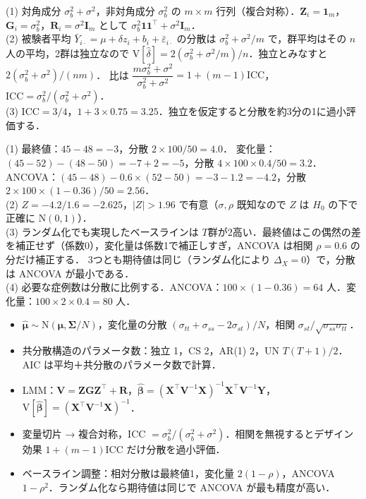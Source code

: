 \documentclass[a4paper,11pt,openany]{ltjsbook}
\newenvironment{kaitou}[1]{%
  \par\medskip\noindent
  \begin{tcolorbox}[enhanced,breakable,colback=bkgray!3,colframe=bkgray!60,boxrule=0.4pt,
    left=4pt,right=4pt,top=2pt,bottom=2pt,arc=1pt,
    title={\cref{#1}の解答},fonttitle=\bfseries\small,coltitle=white,colbacktitle=bkgray!80]}%
  {\end{tcolorbox}\par}
\newcommand{\V}{\mathrm{V}}
\newcommand{\Normal}{\mathrm{N}}
\newcommand{\transp}{^{\top}}
\begin{document}
\begin{kaitou}{reidai:08-2}
(1) 対角成分 $\sigma_b^2+\sigma^2$，非対角成分 $\sigma_b^2$ の $m\times m$ 行列（複合対称）．$\bm Z_i=\bm1_m$，$\bm G_i=\sigma_b^2$，$\bm R_i=\sigma^2\bm I_m$ として $\sigma_b^2\bm1\bm1\transp+\sigma^2\bm I_m$．\\
(2) 被験者平均 $\bar Y_{i\cdot}=\mu+\delta z_i+b_i+\bar\varepsilon_{i\cdot}$ の分散は $\sigma_b^2+\sigma^2/m$ で，群平均はその $n$ 人の平均，2群は独立なので
$\V[\hat\delta]=2(\sigma_b^2+\sigma^2/m)/n$．独立とみなすと $2(\sigma_b^2+\sigma^2)/(nm)$．
比は $\dfrac{m\sigma_b^2+\sigma^2}{\sigma_b^2+\sigma^2}=1+(m-1)\mathrm{ICC}$，$\mathrm{ICC}=\sigma_b^2/(\sigma_b^2+\sigma^2)$．\\
(3) $\mathrm{ICC}=3/4$，$1+3\times0.75=3.25$．独立を仮定すると分散を約3分の1に過小評価する．
\end{kaitou}

\begin{kaitou}{reidai:08-3}
(1) 最終値：$45-48=-3$，分散 $2\times100/50=4.0$．
変化量：$(45-52)-(48-50)=-7+2=-5$，分散 $4\times100\times0.4/50=3.2$．
ANCOVA：$(45-48)-0.6\times(52-50)=-3-1.2=-4.2$，分散 $2\times100\times(1-0.36)/50=2.56$．\\
(2) $Z=-4.2/1.6=-2.625$，$|Z|>1.96$ で有意（$\sigma,\rho$ 既知なので $Z$ は $H_0$ の下で正確に $\Normal(0,1)$）．\\
(3) ランダム化でも実現したベースラインは $T$群が2高い．最終値はこの偶然の差を補正せず（係数0），変化量は係数1で補正しすぎ，ANCOVA は相関 $\rho=0.6$ の分だけ補正する．
3つとも期待値は同じ（ランダム化により $\Delta_X=0$）で，分散は ANCOVA が最小である．\\
(4) 必要な症例数は分散に比例する．ANCOVA：$100\times(1-0.36)=64$ 人．変化量：$100\times2\times0.4=80$ 人．
\end{kaitou}

\begin{summarybox}
\begin{itemize}
\item $\hat{\bm\mu}\sim\Normal(\bm\mu,\bm\Sigma/N)$，変化量の分散 $(\sigma_{tt}+\sigma_{ss}-2\sigma_{st})/N$，相関 $\sigma_{st}/\sqrt{\sigma_{ss}\sigma_{tt}}$．
\item 共分散構造のパラメータ数：独立 1，CS 2，AR(1) 2，UN $T(T+1)/2$．AIC は平均＋共分散のパラメータ数で計算．
\item LMM：$\bm V=\bm Z\bm G\bm Z\transp+\bm R$，$\hat{\bm\beta}=(\bm X\transp\bm V^{-1}\bm X)^{-1}\bm X\transp\bm V^{-1}\bm Y$，$\V[\hat{\bm\beta}]=(\bm X\transp\bm V^{-1}\bm X)^{-1}$．
\item 変量切片 → 複合対称，ICC $=\sigma_b^2/(\sigma_b^2+\sigma^2)$．相関を無視するとデザイン効果 $1+(m-1)\mathrm{ICC}$ だけ分散を過小評価．
\item ベースライン調整：相対分散は最終値1，変化量 $2(1-\rho)$，ANCOVA $1-\rho^2$．ランダム化なら期待値は同じで ANCOVA が最も精度が高い．
\end{itemize}
\end{summarybox}
\end{document}
